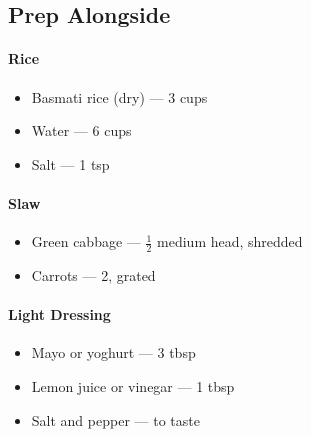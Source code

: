 \documentclass[11pt,a4paper]{article}
\begin{document}
\vspace{0.5em}

\subsection*{Prep Alongside}

\paragraph{Rice}
\begin{itemize}
    \item Basmati rice (dry) — 3 cups
    \item Water — 6 cups
    \item Salt — 1 tsp
\end{itemize}

\paragraph{Slaw}
\begin{itemize}
    \item Green cabbage — $\tfrac{1}{2}$ medium head, shredded
    \item Carrots — 2, grated
\end{itemize}

\paragraph{Light Dressing}
\begin{itemize}
    \item Mayo or yoghurt — 3 tbsp
    \item Lemon juice or vinegar — 1 tbsp
    \item Salt and pepper — to taste
\end{itemize}

\vspace{0.5em}
\end{document}
